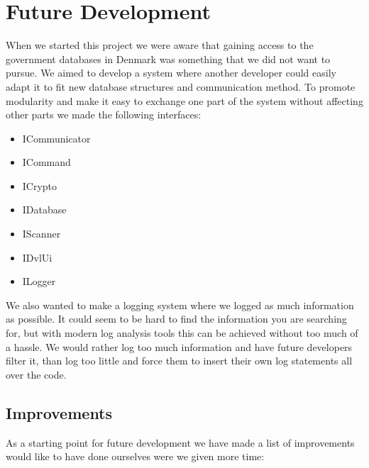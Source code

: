 \documentclass[a4paper]{report}
\begin{document}
\chapter{Future Development}
When we started this project we were aware that gaining access to the government databases in Denmark was something that we did not want to pursue. We aimed to develop a system where another developer could easily adapt it to fit new database structures and communication method. To promote modularity and make it easy to exchange one part of the system without affecting other parts we made the following interfaces:
\begin{itemize}
\item ICommunicator
\item ICommand
\item ICrypto
\item IDatabase
\item IScanner
\item IDvlUi
\item ILogger
\end{itemize}
We also wanted to make a logging system where we logged as much information as possible. It could seem to be hard to find the information you are searching for, but with modern log analysis tools this can be achieved without too much of a hassle. We would rather log too much information and have future developers filter it, than log too little and force them to insert their own log statements all over the code.

\section{Improvements}
As a starting point for future development we have made a list of improvements would like to have done ourselves were we given more time:
\end{document}
